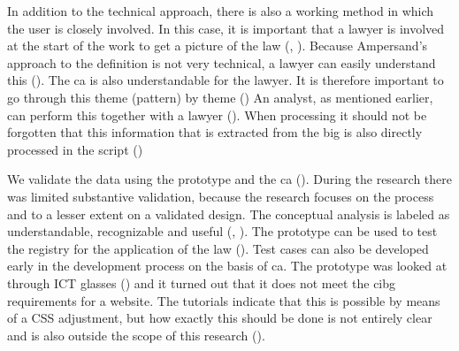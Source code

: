 In addition to the technical approach, there is also a working method in which the user is closely involved.
In this case, it is important that a lawyer is involved at the start of the work to get a picture of the law (, ).
Because Ampersand's approach to the definition is not very technical, a lawyer can easily understand this ().
The \acrshort{ca} is also understandable for the lawyer.
It is therefore important to go through this theme (pattern) by theme ()
An analyst, as mentioned earlier, can perform this together with a lawyer ().
When processing it should not be forgotten that this information that is extracted from the \acrshort{big} is also directly processed in the script ()

We validate the data using the prototype and the \acrlong{ca} ().
During the research there was limited substantive validation, because the research focuses on the process and to a lesser extent on a validated design.
The conceptual analysis is labeled as understandable, recognizable and useful (, ).
The prototype can be used to test the registry for the application of the law ().
Test cases can also be developed early in the development process on the basis of \acrshort{ca}.
The prototype was looked at through ICT glasses () and it turned out that it does not meet the \acrshort{cibg} requirements for a website.
The tutorials indicate that this is possible by means of a CSS adjustment, but how exactly this should be done is not entirely clear and is also outside the scope of this research ().

